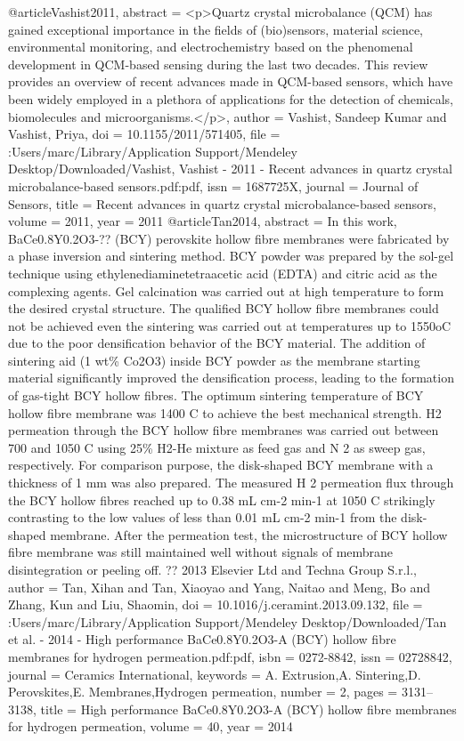 @article{Vashist2011,
abstract = {{\textless}p{\textgreater}Quartz crystal microbalance (QCM) has gained exceptional importance in the fields of (bio)sensors, material science, environmental monitoring, and electrochemistry based on the phenomenal development in QCM-based sensing during the last two decades. This review provides an overview of recent advances made in QCM-based sensors, which have been widely employed in a plethora of applications for the detection of chemicals, biomolecules and microorganisms.{\textless}/p{\textgreater}},
author = {Vashist, Sandeep Kumar and Vashist, Priya},
doi = {10.1155/2011/571405},
file = {:Users/marc/Library/Application Support/Mendeley Desktop/Downloaded/Vashist, Vashist - 2011 - Recent advances in quartz crystal microbalance-based sensors.pdf:pdf},
issn = {1687725X},
journal = {Journal of Sensors},
title = {{Recent advances in quartz crystal microbalance-based sensors}},
volume = {2011},
year = {2011}
}
@article{Tan2014,
abstract = {In this work, BaCe0.8Y0.2O3-?? (BCY) perovskite hollow fibre membranes were fabricated by a phase inversion and sintering method. BCY powder was prepared by the sol-gel technique using ethylenediaminetetraacetic acid (EDTA) and citric acid as the complexing agents. Gel calcination was carried out at high temperature to form the desired crystal structure. The qualified BCY hollow fibre membranes could not be achieved even the sintering was carried out at temperatures up to 1550oC due to the poor densification behavior of the BCY material. The addition of sintering aid (1 wt{\%} Co2O3) inside BCY powder as the membrane starting material significantly improved the densification process, leading to the formation of gas-tight BCY hollow fibres. The optimum sintering temperature of BCY hollow fibre membrane was 1400 C to achieve the best mechanical strength. H2 permeation through the BCY hollow fibre membranes was carried out between 700 and 1050 C using 25{\%} H2-He mixture as feed gas and N 2 as sweep gas, respectively. For comparison purpose, the disk-shaped BCY membrane with a thickness of 1 mm was also prepared. The measured H 2 permeation flux through the BCY hollow fibres reached up to 0.38 mL cm-2 min-1 at 1050 C strikingly contrasting to the low values of less than 0.01 mL cm-2 min-1 from the disk-shaped membrane. After the permeation test, the microstructure of BCY hollow fibre membrane was still maintained well without signals of membrane disintegration or peeling off. ?? 2013 Elsevier Ltd and Techna Group S.r.l.},
author = {Tan, Xihan and Tan, Xiaoyao and Yang, Naitao and Meng, Bo and Zhang, Kun and Liu, Shaomin},
doi = {10.1016/j.ceramint.2013.09.132},
file = {:Users/marc/Library/Application Support/Mendeley Desktop/Downloaded/Tan et al. - 2014 - High performance BaCe0.8Y0.2O3-A (BCY) hollow fibre membranes for hydrogen permeation.pdf:pdf},
isbn = {0272-8842},
issn = {02728842},
journal = {Ceramics International},
keywords = {A. Extrusion,A. Sintering,D. Perovskites,E. Membranes,Hydrogen permeation},
number = {2},
pages = {3131--3138},
title = {{High performance BaCe0.8Y0.2O3-A (BCY) hollow fibre membranes for hydrogen permeation}},
volume = {40},
year = {2014}
}
